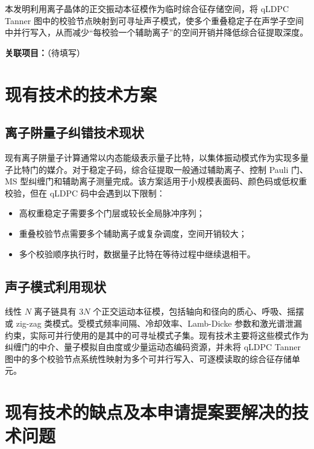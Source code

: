 \documentclass[12pt,a4paper]{article}
\begin{document}
本发明利用离子晶体的正交振动本征模作为临时综合征存储空间，将 qLDPC Tanner 图中的校验节点映射到可寻址声子模式，使多个重叠稳定子在声学子空间中并行写入，从而减少“每校验一个辅助离子”的空间开销并降低综合征提取深度。

\textbf{关联项目：}\underline{\hspace{8cm}}（待填写）

\section{现有技术的技术方案}

\subsection{离子阱量子纠错技术现状}

现有离子阱量子计算通常以内态能级表示量子比特，以集体振动模式作为实现多量子比特门的媒介。对于稳定子码，综合征提取一般通过辅助离子、控制 Pauli 门、MS 型纠缠门和辅助离子测量完成。该方案适用于小规模表面码、颜色码或低权重校验，但在 qLDPC 码中会遇到以下限制：

\begin{itemize}
    \item 高权重稳定子需要多个门层或较长全局脉冲序列；
    \item 重叠校验节点需要多个辅助离子或复杂调度，空间开销较大；
    \item 多个校验顺序执行时，数据量子比特在等待过程中继续退相干。
\end{itemize}

\subsection{声子模式利用现状}

线性 $N$ 离子链具有 $3N$ 个正交运动本征模，包括轴向和径向的质心、呼吸、摇摆或 zig-zag 类模式。受模式频率间隔、冷却效率、Lamb-Dicke 参数和激光谱泄漏约束，实际可并行使用的是其中的可寻址模式子集。现有技术主要将这些模式作为纠缠门的中介、量子模拟自由度或少量运动态编码资源，并未将 qLDPC Tanner 图中的多个校验节点系统性映射为多个可并行写入、可逐模读取的综合征存储单元。

\section{现有技术的缺点及本申请提案要解决的技术问题}
\end{document}
